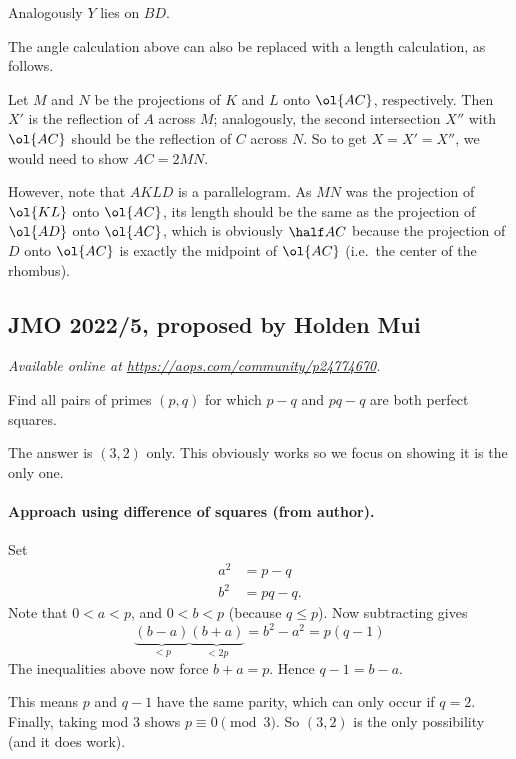 \documentclass[11pt]{scrartcl}
\begin{document}
Analogously $Y$ lies on $BD$.
\begin{remark*}
  The angle calculation above can also be replaced with a length calculation, as follows.

  Let $M$ and $N$ be the projections of $K$ and $L$ onto $\ol{AC}$, respectively.
  Then $X'$ is the reflection of $A$ across $M$;
  analogously, the second intersection $X''$ with $\ol{AC}$
  should be the reflection of $C$ across $N$.
  So to get $X = X' = X''$, we would need to show $AC = 2MN$.

  However, note that $AKLD$ is a parallelogram.
  As $MN$ was the projection of $\ol{KL}$ onto $\ol{AC}$,
  its length should be the same as the projection of $\ol{AD}$ onto $\ol{AC}$,
  which is obviously $\half AC$ because the projection of $D$ onto $\ol{AC}$ is
  exactly the midpoint of $\ol{AC}$ (i.e.\ the center of the rhombus).
\end{remark*}
\pagebreak

\subsection{JMO 2022/5, proposed by Holden Mui}
\textsl{Available online at \url{https://aops.com/community/p24774670}.}
\begin{mdframed}[style=mdpurplebox,frametitle={Problem statement}]
Find all pairs of primes $(p, q)$ for which $p-q$ and $pq-q$ are both perfect squares.
\end{mdframed}
The answer is $(3,2)$ only.
This obviously works so we focus on showing it is the only one.

\paragraph{Approach using difference of squares (from author).}
Set
\begin{align*}
  a^2 &= p-q \\
  b^2 &= pq-q.
\end{align*}
Note that $0 < a < p$, and $0 < b < p$ (because $q \le p$).
Now subtracting gives
\[ \underbrace{(b-a)}_{<p} \underbrace{(b+a)}_{<2p} = b^2-a^2 = p(q-1) \]
The inequalities above now force $b+a = p$.
Hence $q-1 = b-a$.

This means $p$ and $q-1$ have the same parity,
which can only occur if $q = 2$.
Finally, taking mod $3$ shows $p \equiv 0 \pmod 3$.
So $(3,2)$ is the only possibility (and it does work).
\end{document}
